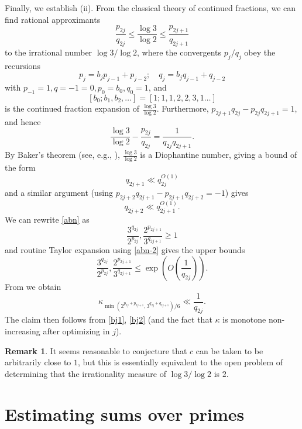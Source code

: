 \documentclass[10pt,a4paper,reqno]{amsart}
\numberwithin{equation}{section}
\theoremstyle{plain}
\theoremstyle{definition}
\newtheorem{remark}[theorem]{Remark}
\begin{document}
Finally, we establish (ii).  From the classical theory of continued fractions, we can find rational approximants
\begin{equation}\label{abn}
 \frac{p_{2j}}{q_{2j}} \leq \frac{\log 3}{\log 2} \leq \frac{p_{2j+1}}{q_{2j+1}}
\end{equation}
to the irrational number $\log 3/\log 2$, where the convergents $p_j/q_j$ obey the recursions
$$ p_j = b_j p_{j-1} + p_{j-2}; \quad q_j = b_j q_{j-1} + q_{j-2}$$
with $p_{-1} = 1, q={-1}=0, p_0 = b_0, q_0=1$, and 
$$[b_0;b_1,b_2,\dots] = [1;1,1,2,2,3,1\dots]$$ 
is the continued fraction expansion of $\frac{\log 3}{\log 2}$.  Furthermore, $p_{2j+1}q_{2j} - p_{2j} q_{2j+1} = 1$, and hence
\begin{equation}\label{abn-2} 
  \frac{\log 3}{\log 2} - \frac{p_{2j}}{q_{2j}} = \frac{1}{q_{2j} q_{2j+1}}.
\end{equation}
By Baker's theorem (see, e.g., \cite{baker-wustholz}), $\frac{\log 3}{\log 2}$ is a Diophantine number, giving a bound of the form
\begin{equation}\label{bj1}
   q_{2j+1} \ll q_{2j}^{O(1)}
\end{equation}
and a similar argument (using $p_{2j+2} q_{2j+1}-p_{2j+1} q_{2j+2} = -1$) gives
\begin{equation}\label{bj2}
 q_{2j+2} \ll q_{2j+1}^{O(1)}.
\end{equation}
We can rewrite \eqref{abn} as
$$ \frac{3^{q_{2j}}}{2^{p_{2j}}}, \frac{2^{p_{2j+1}}}{3^{q_{2j+1}}}\geq 1$$
and routine Taylor expansion using \eqref{abn-2} gives the upper bounds
$$ \frac{3^{q_{2j}}}{2^{p_{2j}}}, \frac{2^{p_{2j+1}}}{3^{q_{2j+1}}}\leq \exp\left( O\left( \frac{1}{q_{2j}}\right)\right).$$
From  we obtain
$$
\kappa_{\min(2^{p_{2j} + p_{2j+1}}, 3^{q_{2j}+q_{2j+1}})/6} \ll \frac{1}{q_{2j}}.$$
The claim then follows from \eqref{bj1}, \eqref{bj2} (and the fact that $\kappa$ is monotone non-increasing after optimizing in $j$).

\begin{remark}
It seems reasonable to conjecture that $c$ can be taken to be arbitrarily close to $1$, but this is essentially equivalent to the open problem of determining that the irrationality measure of $\log 3 / \log 2$ is $2$.
\end{remark}


\section{Estimating sums over primes}\label{primes-sec}
\end{document}
